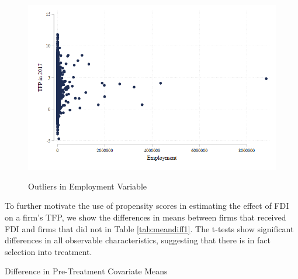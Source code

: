 \documentclass[a4paper,11pt]{scrartcl}
\begin{document}


\begin{figure}[h!]\centering
	\caption{Outliers in Employment Variable}
	\includegraphics[width=\textwidth]{emp15_outliers}
  	\label{fig:outliers}
\end{figure} 
\newpage

To further motivate the use of propensity scores in estimating the effect of FDI on a firm's TFP, we show the differences in means between  firms that received FDI and firms that did not in Table \ref{tab:meandiff1}. The t-tests show significant differences in all observable characteristics, suggesting that there is in fact selection into treatment. %


\begin{table}[h!]
	\centering
	\caption{Difference in Pre-Treatment Covariate Means}
	\makebox[\textwidth]{
	}
	\label{tab:meandiff1}
\end{table}
\end{document}
